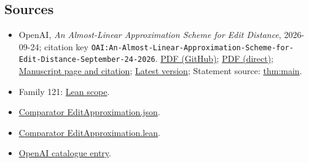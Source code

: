 \documentclass[11pt]{article}
\begin{document}
\subsection{Sources}
\begin{itemize}
\item OpenAI, \emph{An Almost-Linear Approximation Scheme for Edit Distance}, 2026-09-24; citation key \texttt{OAI:An-Almost-Linear-Approximation-Scheme-for-Edit-Distance-September-24-2026}. \href{https://github.com/openai/math/blob/adc7f1241b42e322a6451854ab7e4b4c146bf78a/preprints/An-Almost-Linear-Approximation-Scheme-for-Edit-Distance-September-24-2026/paper.pdf}{PDF (GitHub)}; \href{https://github.com/openai/math/raw/adc7f1241b42e322a6451854ab7e4b4c146bf78a/preprints/An-Almost-Linear-Approximation-Scheme-for-Edit-Distance-September-24-2026/paper.pdf}{PDF (direct)}; \href{https://github.com/openai/math/blob/adc7f1241b42e322a6451854ab7e4b4c146bf78a/preprints/An-Almost-Linear-Approximation-Scheme-for-Edit-Distance-September-24-2026/README.md}{Manuscript page and citation}; \href{https://github.com/openai/math/blob/main/preprints/An-Almost-Linear-Approximation-Scheme-for-Edit-Distance-September-24-2026/paper.pdf}{Latest version}; Statement source: \href{https://github.com/openai/math/blob/adc7f1241b42e322a6451854ab7e4b4c146bf78a/preprints/An-Almost-Linear-Approximation-Scheme-for-Edit-Distance-September-24-2026/build/sections/01-introduction.tex\#L13}{thm:main}.
\item Family 121: \href{https://github.com/openai/math/blob/adc7f1241b42e322a6451854ab7e4b4c146bf78a/lean/docs/121.md}{Lean scope}.
\item \href{https://github.com/openai/math/blob/adc7f1241b42e322a6451854ab7e4b4c146bf78a/lean/ComparatorChallenges/EditApproximation.json}{Comparator EditApproximation.json}.
\item \href{https://github.com/openai/math/blob/adc7f1241b42e322a6451854ab7e4b4c146bf78a/lean/ComparatorChallenges/EditApproximation.lean}{Comparator EditApproximation.lean}.
\item \href{https://github.com/openai/math/blob/adc7f1241b42e322a6451854ab7e4b4c146bf78a/CONTENTS.md}{OpenAI catalogue entry}.
\end{itemize}
\end{document}
